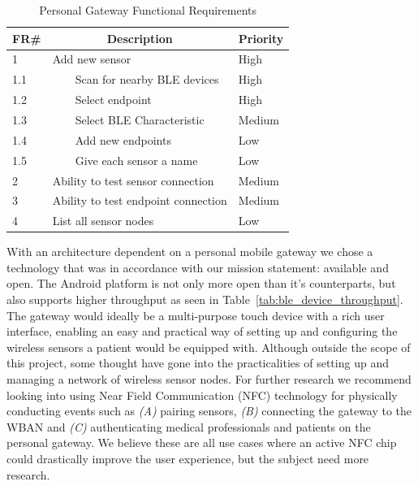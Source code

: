 \begin{table}[]
\centering
\caption{Personal Gateway Functional Requirements}
\label{tab:gatewayRequirements}
\begin{tabular}{|l|l|l|}
\hline
\textbf{FR\#} & \multicolumn{1}{c|}{\textbf{Description}} & \multicolumn{1}{c|}{\textbf{Priority}} \\ \hline
1             & Add new sensor                            & High                                   \\ \hline
1.1           & \ \ \ \ Scan for nearby BLE devices               & High                                   \\ \hline
1.2           & \ \ \ \ Select endpoint                           & High                                   \\ \hline
1.3           & \ \ \ \ Select BLE Characteristic                 & Medium                                 \\ \hline
1.4           & \ \ \ \ Add new endpoints                         & Low                                 \\ \hline
1.5           & \ \ \ \ Give each sensor a name                   & Low                                    \\ \hline
2             & Ability to test sensor connection         & Medium                                 \\ \hline
3             & Ability  to test endpoint connection      & Medium                                 \\ \hline
4             & List all sensor nodes                     & Low                                    \\ \hline
\end{tabular}
\end{table}

With an architecture dependent on a personal mobile gateway we chose a technology that was in accordance with our mission statement: available and open. The Android platform is not only more open than it's counterparts, but also supports higher throughput as seen in Table~\ref{tab:ble_device_throughput}.
The gateway would ideally be a multi-purpose touch device with a rich user interface, enabling an easy and practical way of setting up and configuring the wireless sensors a patient would be equipped with. Although outside the scope of this project, some thought have gone into the practicalities of setting up and managing a network of wireless sensor nodes. For further research we recommend looking into using Near Field Communication (NFC) technology for physically conducting events such as \emph{(A)} pairing sensors, \emph{(B)} connecting the gateway to the WBAN and \emph{(C)} authenticating medical professionals and patients on the personal gateway. We believe these are all use cases where an active NFC chip could drastically improve the user experience, but the subject need more research.


